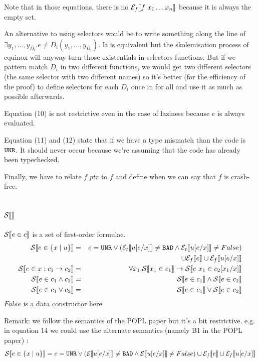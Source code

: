 \documentclass{article}
\begin{document}
Note that in those equations, there is no $\mathcal{E}_{f} \llbracket f~x_1 \dots x_n \rrbracket$ because it is always the empty set.

An alternative to using selectors would be to write something along the line of $\exists y_1,\dots,y_{D_i}. e \neq D_i(y_1,\dots,y_{D_i})$. It is equivalent but the skolemisation process of equinox will anyway turn those existentials in selectors functions. But if we pattern match $D_i$ in two different functions, we would get two different selectors (the same selector with two different names) so it's better (for the efficiency of the proof) to define selectors for each $D_i$ once in for all and use it as much as possible afterwards.

Equation (10) is not restrictive even in the case of laziness because $e$ is always evaluated.

Equation (11) and (12) state that if we have a type mismatch than the code is $\texttt{UNR}$. It should never occur because we're assuming that the code has already been typechecked. %

Finally, we have to relate $f\_ptr$ to $f$ and define when we can say that $f$ is crash-free.


\subsection{$\mathcal{S} \llbracket  \rrbracket$}
$\mathcal{S} \llbracket e \in c \rrbracket$ is a set of first-order formulae.
\begin{eqnarray}
\mathcal{S} \llbracket e \in \{x \mid u \} \rrbracket &=& e = \texttt{UNR} \lor (\mathcal{E}_t \llbracket u[e/x] \rrbracket \neq \texttt{BAD} \land \mathcal{E}_t \llbracket u[e/x] \rrbracket \neq False)\\
&& \cup \mathcal{E}_{f} \llbracket e \rrbracket \cup \mathcal{E}_{f} \llbracket u[e/x] \rrbracket\\
\mathcal{S} \llbracket e \in x:c_1 \to c_2 \rrbracket  &=& \forall x_1. \mathcal{S} \llbracket x_1 \in c_1 \rrbracket \to \mathcal{S} \llbracket e~x_1 \in c_2[x_1/x] \rrbracket\\
\mathcal{S} \llbracket e \in c_1 \land c_2 \rrbracket &=& \mathcal{S} \llbracket e \in c_1 \rrbracket \land \mathcal{S} \llbracket e \in c_2 \rrbracket\\
\mathcal{S} \llbracket e \in c_1 \lor c_2 \rrbracket &=& \mathcal{S} \llbracket e \in c_1 \rrbracket \lor \mathcal{S} \llbracket e \in c_2 \rrbracket\\
\end{eqnarray}
$False$ is a data constructor here.

Remark: we follow the semantics of the POPL paper but it's a bit restrictive.
e.g. in equation 14 we could use the alternate semantics (namely B1 in the POPL paper) : 
$$\mathcal{S} \llbracket e \in \{x \mid u \} \rrbracket = e = \texttt{UNR} \lor (\mathcal{E} \llbracket u[e/x] \rrbracket \neq \texttt{BAD} \land \mathcal{E} \llbracket u[e/x] \rrbracket \neq False) \cup \mathcal{E}_{f} \llbracket e \rrbracket \cup \mathcal{E}_{f} \llbracket u[e/x] \rrbracket$$
\end{document}
